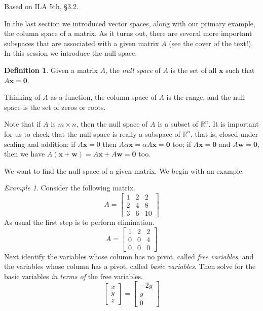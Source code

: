 \documentclass[11pt,oneside]{amsbook}
\newcommand{\R}{\mathbb R}
\theoremstyle{definition}
\theoremstyle{plain}
\theoremstyle{definition}
\newtheorem{definition}[theorem]{Definition}
\theoremstyle{remark}
\newtheorem{example}[theorem]{Example}
\numberwithin{equation}{section}
\numberwithin{figure}{section}
\begin{document}
Based on ILA 5th, \S 3.2.

In the last section we introduced vector spaces, along with our primary example, the column space of a matrix. As it turns out, there are several more important subspaces that are associated with a given matrix $A$ (see the cover of the text!). In this session we introduce the null space.

\begin{definition}
  Given a matrix $A$, the \emph{null space} of $A$ is the set of all $\mathbf{x}$ such that $A\mathbf{x}=\mathbf{0}$.
\end{definition}

Thinking of $A$ as a function, the column space of $A$ is the range, and the null space is the set of zeros or roots.

Note that if $A$ is $m\times n$, then the null space of $A$ is a subset of $\R^n$. It is important for us to check that the null space is really a subspace of $\R^n$, that is, closed under scaling and addition: if $A\mathbf{x}=0$ then $A\alpha\mathbf{x}=\alpha A\mathbf{x}=\mathbf{0}$ too; if $A\mathbf{x}=\mathbf{0}$ and $A\mathbf{w}=\mathbf{0}$, then we have $A(\mathbf{x}+\mathbf{w})=A\mathbf{x}+A\mathbf{w}=\mathbf{0}$ too.

We want to find the null space of a given matrix. We begin with an example.

\begin{example}
  Consider the following matrix.
  \[A=\begin{bmatrix}1&2&2\\2&4&8\\3&6&10\end{bmatrix}
  \]
  As usual the first step is to perform elimination.
  \[A=\begin{bmatrix}1&2&2\\0&0&4\\0&0&0\end{bmatrix}
  \]
  Next identify the variables whose column has no pivot, called \emph{free variables}, and the variables whose column has a pivot, called \emph{basic variables}. Then solve for the basic variables \emph{in terms of} the free variables.
  \[\begin{bmatrix}x\\y\\z\end{bmatrix}
    =\begin{bmatrix}-2y\\y\\0\end{bmatrix}
  \]
\end{example}
\end{document}
